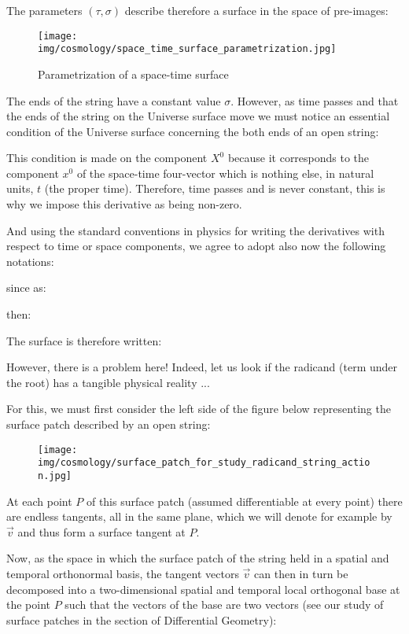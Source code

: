 	The parameters $(\tau,\sigma)$ describe therefore a surface in the space of pre-images:
	\begin{figure}[H]
		\centering
		\texttt{[image: img/cosmology/space\_time\_surface\_parametrization.jpg]}	
		\caption{Parametrization of a space-time surface}
	\end{figure}
	The ends of the string have a constant value $\sigma$. However, as time passes and that the ends of the string on the Universe surface move we must notice an essential condition of the Universe surface concerning the both ends of an open string:
	
	\begin{tcolorbox}[title=Remark,colframe=black,arc=10pt]
	This condition is made on the component $X^0$ because it corresponds to the component $x^0$ of the space-time four-vector which is nothing else, in natural units, $t$ (the proper time). Therefore, time passes and is never constant, this is why we  impose this derivative as being non-zero.
	\end{tcolorbox}
	And using the standard conventions in physics for writing the derivatives with respect to time or space components, we agree to adopt also now the following notations:
	
	since as:
	
	then:
	
	The surface is therefore written:
	
	However, there is a problem here! Indeed, let us look if the radicand (term under the root) has a tangible physical reality ...

	For this, we must first consider the left side of the figure below representing the surface patch described by an open string:
	\begin{figure}[H]
		\centering
		\texttt{[image: img/cosmology/surface\_patch\_for\_study\_radicand\_string\_action.jpg]}	
	\end{figure}
	At each point $P$ of this surface patch (assumed differentiable at every point) there are endless tangents, all in the same plane, which we will denote for example by $\vec{v}$ and thus form a surface tangent at $P$.

	Now, as the space in which the surface patch of the string held in a spatial and temporal orthonormal basis, the tangent vectors $\vec{v}$ can then in turn be decomposed into a two-dimensional spatial and temporal local orthogonal base at the point $P$ such that the vectors of the base are two vectors (see our study of surface patches in the section of Differential Geometry):
	

